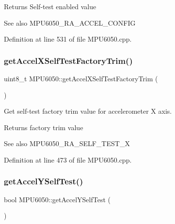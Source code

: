 \begin{DoxyReturn}{Returns}
Self-\/test enabled value 
\end{DoxyReturn}
\begin{DoxySeeAlso}{See also}
M\+P\+U6050\+\_\+\+R\+A\+\_\+\+A\+C\+C\+E\+L\+\_\+\+C\+O\+N\+F\+IG 
\end{DoxySeeAlso}


Definition at line 531 of file M\+P\+U6050.\+cpp.

\mbox{\label{classMPU6050_a0cfaa7fbf63fb5867e003d490eb3fd96}} 
\subsubsection{\texorpdfstring{getAccelXSelfTestFactoryTrim()}{getAccelXSelfTestFactoryTrim()}}
{\footnotesize\ttfamily uint8\+\_\+t M\+P\+U6050\+::get\+Accel\+X\+Self\+Test\+Factory\+Trim (\begin{DoxyParamCaption}{ }\end{DoxyParamCaption})}



Get self-\/test factory trim value for accelerometer X axis. 

\begin{DoxyReturn}{Returns}
factory trim value 
\end{DoxyReturn}
\begin{DoxySeeAlso}{See also}
M\+P\+U6050\+\_\+\+R\+A\+\_\+\+S\+E\+L\+F\+\_\+\+T\+E\+S\+T\+\_\+X 
\end{DoxySeeAlso}


Definition at line 473 of file M\+P\+U6050.\+cpp.

\mbox{\label{classMPU6050_a2523e798db3baf9cb9dbf347af16639b}} 
\subsubsection{\texorpdfstring{getAccelYSelfTest()}{getAccelYSelfTest()}}
{\footnotesize\ttfamily bool M\+P\+U6050\+::get\+Accel\+Y\+Self\+Test (\begin{DoxyParamCaption}{ }\end{DoxyParamCaption})}



